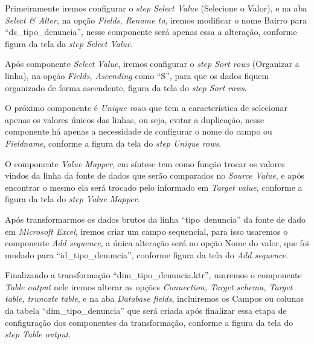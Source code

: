 Primeiramente iremos configurar o \textit{step Select Value} (Selecione o Valor), e na aba \textit{Select & Alter}, na op\c{c}\~{a}o \textit{Fields, Rename to}, iremos modificar o nome Bairro para ``ds\_tipo\_denuncia'', nesse componente ser\'{a} apenas essa a altera\c{c}\~{a}o, conforme figura da tela da \textit{step Select Value}.

Ap\'os  componente \textit{Select Value}, iremos configurar o \textit{step Sort rows} (Organizar a linha), na op\c{c}\~{a}o \textit{Fields, Ascending} como ``S'', para que os dados fiquem organizado de forma ascendente, figura da tela do \textit{step Sort rows}.

O pr\'oximo componente \'{e} \textit{Unique rows} que tem a característica de selecionar apenas os valores únicos das linhas, ou seja, evitar a duplica\c{c}\~{a}o, nesse componente h\'{a} apenas a necessidade de configurar o nome do campo ou \textit{Fieldname}, conforme a figura da tela do \textit{step Unique rows}.

O componente \textit{Value Mapper}, em síntese tem como fun\c{c}\~{a}o trocar os valores vindos da linha da fonte de dados que ser\~{a}o comparados no \textit{Source Value}, e ap\'os encontrar o mesmo ela ser\'{a} trocado pelo informado em \textit{Target value}, conforme a figura da tela do \textit{step Value Mapper}.

Ap\'os transformarmos os dados brutos da linha ``tipo\ denuncia'' da fonte de dado em \textit{Microsoft Excel}, iremos criar um campo sequencial, para isso usaremos o componente \textit{Add sequence}, a única altera\c{c}\~{a}o ser\'{a} no op\c{c}\~{a}o Nome do valor, que foi mudado para ``id\_tipo\_denuncia'', conforme figura da tela do \textit{Add sequence}.

Finalizando a transforma\c{c}\~{a}o ``dim\_tipo\_denuncia.ktr'', usaremos o componente \textit{Table output} nele iremos alterar as op\c{c}\~{o}es \textit{Connection, Target schema, Target table, truncate table}, e na aba \textit{Database fields}, incluiremos os Campos ou colunas da tabela ``dim\_tipo\_denuncia'' que ser\'{a} criada ap\'os finalizar essa etapa de configura\c{c}\~{a}o dos componentes da transforma\c{c}\~{a}o, conforme a figura da tela do \textit{step Table output}.

